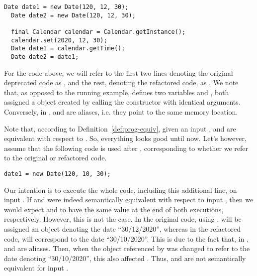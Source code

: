 \documentclass[runningheads,a4paper]{llncs}
\begin{document}
\begin{example}\label{ex:aliasing}
\begin{lstlisting}[mathescape=true,showstringspaces=false]
  Date date1 = new Date(120, 12, 30);
  Date date2 = new Date(120, 12, 30);  
  
  final Calendar calendar = Calendar.getInstance();
  calendar.set(2020, 12, 30);
  Date date1 = calendar.getTime();
  Date date2 = date1;
\end{lstlisting}

For the code above, we will refer to the first two lines denoting the
original deprecated code as , and the rest, denoting the
refactored code, as .  We note that, as opposed to the
running example,  defines two variables  and
, both assigned a  object created by calling the
 constructor with identical arguments.
Conversely, in ,  and  are aliases, i.e. they point to the same
memory location.

Note that, according to Definition~\ref{def:prog-equiv}, given an input ,  and  are equivalent with respect to .
So, everything looks good until now. Let's however, assume that the following code
is used after , corresponding to whether we refer to the original or refactored code.

\begin{lstlisting}[mathescape=true,showstringspaces=false]
  date1 = new Date(120, 10, 30);
\end{lstlisting}

Our intention is to execute the whole code, including this additional line, on input .
If  and  were indeed semantically equivalent with respect to input ,
then we would expect  and  to have the same value at the end of both
executions, respectively. However, this is not the case.
In the original code, using ,  will be assigned an object
denoting the date ``30/12/2020'', whereas in the refactored code,
 will correspond to the date ``30/10/2020''. This is due to the fact that,
in ,  and  are aliases. Then, when the object referenced by
 was changed to refer to the date denoting ``30/10/2020'', this also affected .
Thus,  and  are not semantically equivalent for input .
\end{example}  
\end{document}
